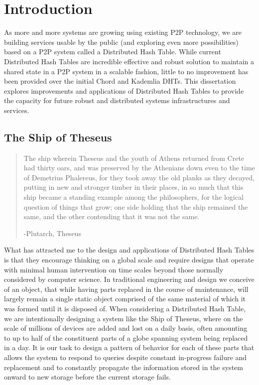 





\chapter{Introduction}

As more and more systems are growing using existing P2P technology, we are building services usable by the public (and exploring even more possibilities) based on a P2P system called a Distributed Hash Table.
While current Distributed Hash Tables are incredible effective and robust solution to maintain a shared state in a P2P system in a scalable fashion, little to no improvement has been provided over the initial Chord\cite{chord} and Kademlia\cite{kademlia} DHTs.
This dissertation explores improvements and applications of Distributed Hash Tables to provide the capacity for future robust and distributed systems infrastructures and services.

\section{The Ship of Theseus}

\singlespacing
\blockquote{The ship wherein Theseus and the youth of Athens returned from Crete had thirty oars, and was preserved by the Athenians down even to the time of Demetrius Phalereus, for they took away the old planks as they decayed, putting in new and stronger timber in their places, in so much that this ship became a standing example among the philosophers, for the logical question of things that grow; one side holding that the ship remained the same, and the other contending that it was not the same.

-Plutarch, Theseus

}
\doublespacing

What has attracted me to the design and applications of Distributed Hash Tables is that they encourage thinking on a global scale and require designs that operate with minimal human intervention on time scales beyond those normally considered by computer science.
In traditional engineering and design we conceive of an object, that while having parts replaced in the course of maintenance, will largely remain a single static object comprised of the same material of which it was formed until it is disposed of.
When considering a Distributed Hash Table, we are intentionally designing a system like the Ship of Theseus, where on the scale of millions of devices are added and lost on a daily basis, often amounting to up to half of the constituent parts of a globe spanning system being replaced in a day.
It is our task to design a pattern of behavior for each of these parts that allows the system to respond to queries despite constant in-progress failure and replacement and to constantly propagate the information stored in the system onward to new storage before the current storage fails. 

